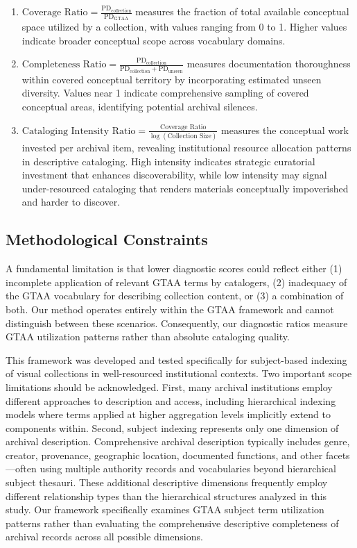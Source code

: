 \documentclass[final]{anthology-ch}
\begin{document}
\begin{enumerate}
    \item $\textrm{Coverage Ratio} = \frac{\textrm{PD}_{\textrm{collection}}}{\textrm{PD}_{\textrm{GTAA}}}$ measures the fraction of total available conceptual space utilized by a collection, with values ranging from 0 to 1. Higher values indicate broader conceptual scope across vocabulary domains.
   \item $\textrm{Completeness Ratio} = \frac{\textrm{PD}_{\textrm{collection}}}{\textrm{PD}_{\textrm{collection}} + \textrm{PD}_{\textrm{unseen}}}$ measures documentation thoroughness within covered conceptual territory by incorporating estimated unseen diversity. Values near 1 indicate comprehensive sampling of covered conceptual areas, identifying potential archival silences.
    \item $\textrm{Cataloging Intensity Ratio} = \frac{\textrm{Coverage Ratio}}{\log(\textrm{Collection Size})}$  measures the conceptual work invested per archival item, revealing institutional resource allocation patterns in descriptive cataloging. High intensity indicates strategic curatorial investment that enhances discoverability, while low intensity may signal under-resourced cataloging that renders materials conceptually impoverished and harder to discover.
\end{enumerate}

\subsection{Methodological Constraints}

A fundamental limitation is that lower diagnostic scores could reflect either (1) incomplete application of relevant GTAA terms by catalogers, (2) inadequacy of the GTAA vocabulary for describing collection content, or (3) a combination of both. Our method operates entirely within the GTAA framework and cannot distinguish between these scenarios. Consequently, our diagnostic ratios measure GTAA utilization patterns rather than absolute cataloging quality.

This framework was developed and tested specifically for subject-based indexing of visual collections in well-resourced institutional contexts. Two important scope limitations should be acknowledged. First, many archival institutions employ different approaches to description and access, including hierarchical indexing models where terms applied at higher aggregation levels implicitly extend to components within. Second, subject indexing represents only one dimension of archival description. Comprehensive archival description typically includes genre, creator, provenance, geographic location, documented functions, and other facets—often using multiple authority records and vocabularies beyond hierarchical subject thesauri. These additional descriptive dimensions frequently employ different relationship types than the hierarchical structures analyzed in this study. Our framework specifically examines GTAA subject term utilization patterns rather than evaluating the comprehensive descriptive completeness of archival records across all possible dimensions.
\end{document}
